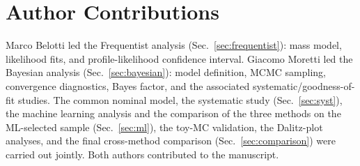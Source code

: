 \section{Author Contributions}
\label{sec:contributions}
Marco Belotti led the Frequentist analysis (Sec.~\ref{sec:frequentist}): mass model, likelihood fits, and profile-likelihood confidence interval. Giacomo Moretti led the Bayesian analysis (Sec.~\ref{sec:bayesian}): model definition, MCMC sampling, convergence diagnostics, Bayes factor, and the associated systematic/goodness-of-fit studies. The common nominal model, the systematic study (Sec.~\ref{sec:syst}), the machine learning analysis and the comparison of the three methods on the ML-selected sample (Sec.~\ref{sec:ml}), the toy-MC validation, the Dalitz-plot analyses, and the final cross-method comparison (Sec.~\ref{sec:comparison}) were carried out jointly. Both authors contributed to the manuscript.
